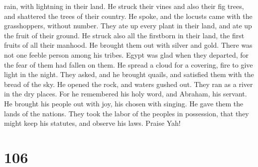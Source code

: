 rain, with lightning in their land.  He struck their vines
and also their fig trees, and shattered the trees of their country.
 He spoke, and the locusts came with the grasshoppers,
without number.  They ate up every plant in their land, and
ate up the fruit of their ground.  He struck also all the
firstborn in their land, the first fruits of all their manhood.
 He brought them out with silver and gold. There was not
one feeble person among his tribes.  Egypt was glad when
they departed, for the fear of them had fallen on them.  He
spread a cloud for a covering, fire to give light in the night.
 They asked, and he brought quails, and satisfied them with
the bread of the sky.  He opened the rock, and waters
gushed out. They ran as a river in the dry places.  For he
remembered his holy word, and Abraham, his servant.  He
brought his people out with joy, his chosen with singing. 
He gave them the lands of the nations. They took the labor of the
peoples in possession,  that they might keep his statutes,
and observe his laws. Praise Yah!

\hypertarget{section-96}{%
\section{106}\label{section-96}}

